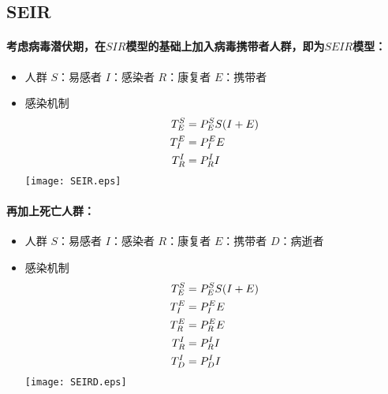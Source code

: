\subsection{SEIR}
\paragraph{考虑病毒潜伏期，在$SIR$模型的基础上加入病毒携带者人群，即为$SEIR$模型：}
\begin{itemize}
	\item 人群
	\subitem $S$：易感者
	\subitem $I$：感染者
	\subitem $R$：康复者
	\subitem $E$：携带者
	\item 感染机制
	\subitem
	\begin{align}
	T^{S}_{E}&=P^{S}_{E}S(I+E)\\
	T^{E}_{I}&=P^{E}_{I}E\\
	T^{I}_{R}&=P^{I}_{R}I
	\end{align}
	\texttt{[image: SEIR.eps]}
\end{itemize}
\paragraph{再加上死亡人群：}
\begin{itemize}
	\item 人群
	\subitem $S$：易感者
	\subitem $I$：感染者
	\subitem $R$：康复者
	\subitem $E$：携带者
	\subitem $D$：病逝者
	\item 感染机制
	\subitem
	\begin{align}
	T^{S}_{E}&=P^{S}_{E}S(I+E)\\
	T^{E}_{I}&=P^{E}_{I}E\\
	T^{E}_{R}&=P^{E}_{R}E\\
	T^{I}_{R}&=P^{I}_{R}I\\
	T^{I}_{D}&=P^{I}_{D}I
	\end{align}
	\texttt{[image: SEIRD.eps]}
\end{itemize}
